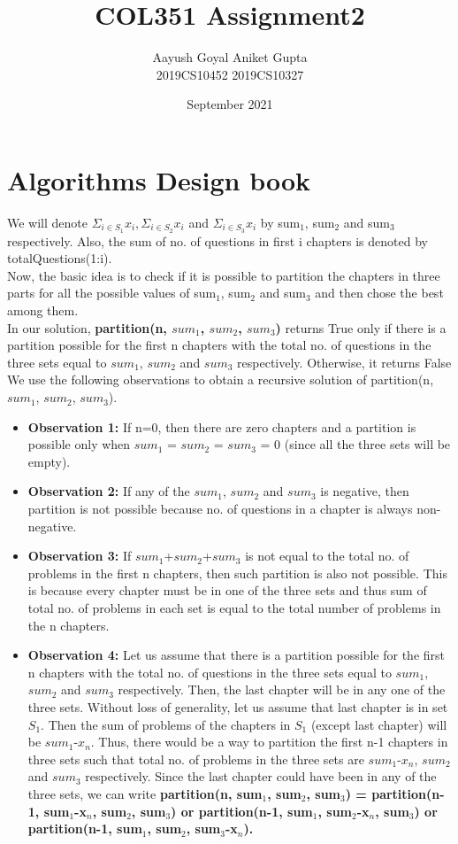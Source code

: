 \documentclass{article}
\title{COL351 Assignment2}
\author{Aayush Goyal \hspace{2cm} Aniket Gupta
\\ 2019CS10452    \hspace{2.3cm}    2019CS10327}
\date{September 2021}
\begin{document}
\maketitle

\section{Algorithms Design book}
We will denote $\Sigma_{i\in{S_{1}}}x_{i}, \Sigma_{i\in{S_{2}}}x_{i}$ and $\Sigma_{i\in{S_{3}}}x_{i}$ by sum$_{1}$, sum$_{2}$ and sum$_{3}$ respectively. Also, the sum of no. of questions in first i chapters is denoted by totalQuestions(1:i).
\\
Now, the basic idea is to check if it is possible to partition the chapters in three parts for all the possible values of sum$_{1}$, sum$_{2}$ and sum$_{3}$ and then chose the best among them.
\\
In our solution, \textbf{partition(n, $sum_1$, $sum_2$, $sum_3$)} returns True only if there is a partition possible for the first n chapters with the total no. of questions in the three sets equal to $sum_1$, $sum_2$ and $sum_3$ respectively. Otherwise, it returns False\\
We use the following observations to obtain a recursive solution of partition(n, $sum_1$, $sum_2$, $sum_3$).

\begin{itemize}
\item \textbf{Observation 1:} If n=0, then there are zero chapters and a partition is possible only when $sum_1$ = $sum_2$ = $sum_3$ = 0 (since all the three sets will be empty). 
\item \textbf{Observation 2:} If any of the $sum_1$, $sum_2$ and $sum_3$ is negative, then partition is not possible because no. of questions in a chapter is always non-negative.
\item \textbf{Observation 3:} If $sum_1$+$sum_2$+$sum_3$ is not equal to the total no. of problems in the first n chapters, then such partition is also not possible. This is because every chapter must be in one of the three sets and thus sum of total no. of problems in each set is equal to the total number of problems in the n chapters. 
\item \textbf{Observation 4:} Let us assume that there is a partition possible for the first n chapters with the total no. of questions in the three sets equal to $sum_1$, $sum_2$ and $sum_3$ respectively. Then, the last chapter will be in any one of the three sets. Without loss of generality, let us assume that last chapter is in set $S_1$. Then the sum of problems of the chapters in $S_1$ (except last chapter) will be $sum_1$-$x_n$. Thus, there would be a way to partition the first n-1 chapters in three sets such that total no. of problems in the three sets are $sum_1$-$x_n$, $sum_2$ and $sum_3$ respectively. Since the last chapter could have been in any of the three sets, we can write \textbf{partition(n, sum$_{1}$, sum$_{2}$, sum$_{3}$) = partition(n-1, sum$_{1}$-x$_{n}$, sum$_{2}$, sum$_{3}$) or partition(n-1, sum$_{1}$, sum$_{2}$-x$_{n}$, sum$_{3}$) or partition(n-1, sum$_{1}$, sum$_{2}$, sum$_{3}$-x$_{n}$).}
\end{itemize}
\end{document}
